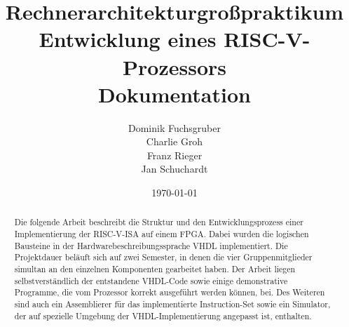 \documentclass{report}
\title{\large \textbf{Rechnerarchitekturgro\ss{}praktikum} \\[10pt] Entwicklung eines RISC-V-Prozessors \\[10pt] \Huge Dokumentation}
\author{Dominik Fuchsgruber \\ Charlie Groh \\ Franz Rieger \\ Jan Schuchardt}
\date{\today}
\begin{document}
\maketitle
\begin{abstract}
Die folgende Arbeit beschreibt die Struktur und den Entwicklungsprozess einer
Implementierung der RISC-V-ISA auf einem FPGA. Dabei wurden die logischen
Bausteine in der Hardwarebeschreibungssprache VHDL implementiert. Die
Projektdauer bel\"auft sich auf zwei Semester, in denen die vier
Gruppenmitglieder simultan an den einzelnen Komponenten gearbeitet haben. Der
Arbeit liegen selbstverst\"andlich der entstandene VHDL-Code sowie einige
demonstrative Programme, die vom Prozessor korrekt ausgef\"uhrt werden
k\"onnen, bei. Des Weiteren sind auch ein Assemblierer f\"ur das implementierte
Instruction-Set sowie ein Simulator, der auf spezielle Umgebung der
VHDL-Implementierung angepasst ist, enthalten.
\end{abstract}
\begingroup
\let\clearpage\relax
\tableofcontents
\listoftables
\listoffigures
\endgroup
\clearpage{}








\appendix{}

\clearpage{}

\clearpage{}

\clearpage{}
\end{document}
